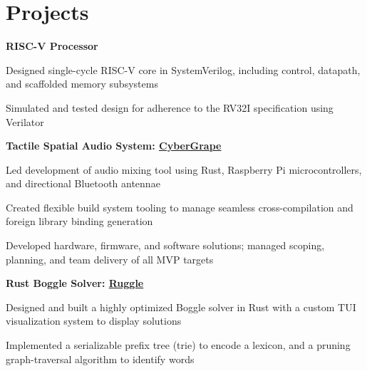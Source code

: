 \documentclass[10pt]{article}
\newenvironment{mylist}[1][]
{\itemize[nosep, wide=0pt, leftmargin=*, after=\strut]}
{\enditemize}
\begin{document}

\section{Projects}

\begin{minipage}[t]{\linewidth}
    \textbf{RISC-V Processor}
    \begin{mylist}
    \item Designed single-cycle RISC-V core in SystemVerilog, including control, datapath, and scaffolded memory subsystems
    \item Simulated and tested design for adherence to the RV32I specification using Verilator
    \end{mylist}
\end{minipage}

\begin{minipage}[t]{\linewidth}
    \textbf{Tactile Spatial Audio System: \href{https://sgilfeather.github.io/CyberGrape/cybergrape/index.html}{CyberGrape}}
    \begin{mylist}
        \item Led development of audio mixing tool using Rust, Raspberry Pi microcontrollers, and directional Bluetooth antennae
        \item Created flexible build system tooling to manage seamless cross-compilation and foreign library binding generation
        \item Developed hardware, firmware, and software solutions; managed scoping, planning, and team delivery of all MVP targets
    \end{mylist}
\end{minipage}

\begin{minipage}[t]{\linewidth}
    \textbf{Rust Boggle Solver: \href{https://github.com/liam-strand/ruggle}{Ruggle}}
    \begin{mylist}
        \item Designed and built a highly optimized Boggle solver in Rust with a custom TUI visualization system to display solutions
        \item Implemented a serializable prefix tree (trie) to encode a lexicon, and a pruning graph-traversal algorithm to identify words
    \end{mylist}
\end{minipage}
\end{document}
